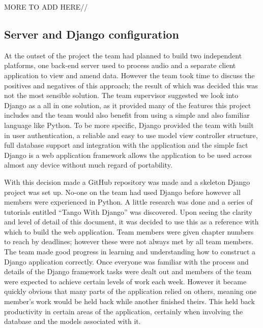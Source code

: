 \documentclass{l3proj}
\begin{document}
MORE TO ADD HERE//



\subsection{Server and Django configuration}

At the outset of the project the team had planned to build two independent platforms, one back-end server used to process audio and a separate client application to view and amend data. However the team took time to discuss the positives and negatives of this approach; the result of which was decided this was not the most sensible solution. 
The team supervisor suggested we look into Django as a all in one solution, as it provided many of the features this project includes and the team would also benefit from using a simple and also familiar language like Python. 
To be more specific, Django provided the team with built in user authentication, a reliable and easy to use model view controller structure, full database support and integration with the application and the simple fact Django is a web application framework allows the application to be used across almost any device without much regard of portability.

With this decision made a GitHub repository was made and a skeleton Django project was set up. No-one on the team had used Django before however all members were experienced in Python. A little research was done and a series of tutorials entitled “Tango With Django” was discovered.
Upon seeing the clarity and level of detail of this document, it was decided to use this as a reference with which to build the web application. 
Team members were given chapter numbers to reach by deadlines; however these were not always met by all team members. The team made good progress in learning and understanding how to construct a Django application correctly. 
Once everyone was familiar with the process and details of the Django framework tasks were dealt out and members of the team were expected to achieve certain levels of work each week. However it became quickly obvious that many parts of the application relied on others, meaning one member’s work would be held back while another finished theirs. This held back productivity in certain areas of the application, certainly when involving the database and the models associated with it.
\end{document}
